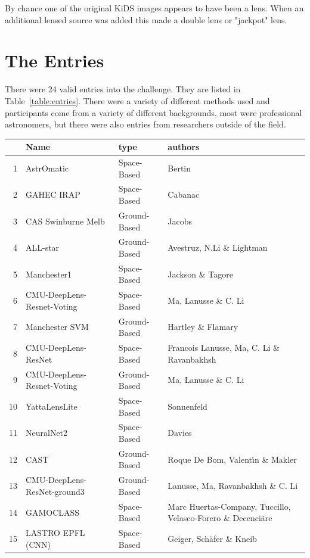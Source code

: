 \documentclass[useAMS,usenatbib]{mnras}
\newcommand{\red}[1]{{\color{red} #1}}
\begin{document}
By chance one of the original KiDS images appears to have been a lens.  When an additional lensed source was added this made a double lens or "jackpot" lens.

\section{The Entries}
\label{sec:entries}

There were 24 valid entries into the challenge.  They are listed in Table~\ref{table:entries}.  There were a variety of different methods used and participants come from a variety of different backgrounds, most were professional astronomers, but there were also entries from researchers outside of the field.  

\begin{table}
\centering
\begin{tabular}{rlll}
  \hline
 & Name & type & authors \\ 
  \hline
  1 & AstrOmatic & Space-Based & Bertin   \\ 
  2 & GAHEC IRAP & Space-Based & Cabanac  \\ 
  3 & \red{CAS Swinburne Melb} & Ground-Based & Jacobs   \\ 
  4 & ALL-star & Ground-Based & Avestruz, N.Li \& Lightman  \\ 
  5 & Manchester1 & Space-Based & Jackson \& Tagore  \\ 
  6 & CMU-DeepLens-Resnet-Voting & Space-Based & Ma, Lanusse \& C. Li  \\ 
  7 & Manchester SVM & Ground-Based & Hartley \& Flamary  \\ 
  8 & CMU-DeepLens-ResNet & Space-Based & Francois Lanusse, Ma, C. Li \& Ravanbakhsh \\ 
  9 & CMU-DeepLens-Resnet-Voting & Ground-Based & Ma, Lanusse \& C. Li   \\ 
  10 & YattaLensLite & Space-Based &  Sonnenfeld  \\ 
  11 & \red{NeuralNet2} & Space-Based &  Davies  \\ 
  12 & CAST & Ground-Based &  Roque De Bom, Valent\'{\i}n \&  Makler  \\ 
  13 & CMU-DeepLens-ResNet-ground3 & Ground-Based &  Lanusse, Ma, Ravanbakhsh \& C. Li \\ 
  14 & GAMOCLASS & Space-Based & Marc Huertas-Company, Tuccillo, Velasco-Forero \& Decenci\~{a}re \\ 
  15 & LASTRO EPFL (CNN) & Space-Based & Geiger, Sch\"{a}fer \& Kneib \\ 

\end{tabular}
\end{table}
\end{document}
